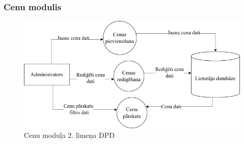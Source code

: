 \clearpage
\subsubsection{Cenu modulis}

\begin{figure}[htbp]
	\centering
	\includegraphics[width=\linewidth]{./src/img/CenuModulis.png}
	\caption{Cenu moduļa 2. līmeņa DPD}
	\label{fig:dpd-2-price}
\end{figure}




